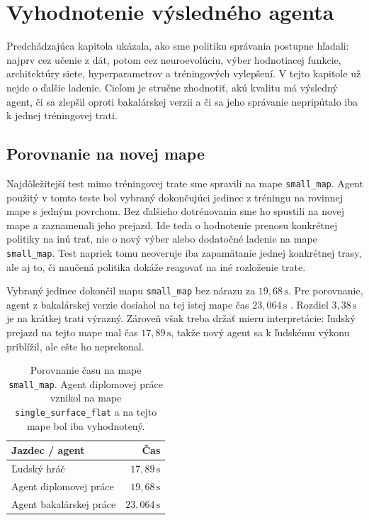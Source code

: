 \chapter{Vyhodnotenie výsledného agenta}
\label{chap:vyhodnotenie_agenta}

Predchádzajúca kapitola ukázala, ako sme politiku správania postupne hľadali: najprv cez učenie z dát, potom cez neuroevolúciu, výber hodnotiacej funkcie, architektúry siete, hyperparametrov a tréningových vylepšení. V tejto kapitole už nejde o ďalšie ladenie. Cieľom je stručne zhodnotiť, akú kvalitu má výsledný agent, či sa zlepšil oproti bakalárskej verzii a či sa jeho správanie nepripútalo iba k jednej tréningovej trati.

\section{Porovnanie na novej mape}

Najdôležitejší test mimo tréningovej trate sme spravili na mape \texttt{small\_map}. Agent použitý v tomto teste bol vybraný dokončujúci jedinec z tréningu na rovinnej mape s jedným povrchom. Bez ďalšieho dotrénovania sme ho spustili na novej mape a zaznamenali jeho prejazd. Ide teda o hodnotenie prenosu konkrétnej politiky na inú trať, nie o nový výber alebo dodatočné ladenie na mape \texttt{small\_map}. Test napriek tomu neoveruje iba zapamätanie jednej konkrétnej trasy, ale aj to, či naučená politika dokáže reagovať na iné rozloženie trate.

Vybraný jedinec dokončil mapu \texttt{small\_map} bez nárazu za \(19{,}68\,\mathrm{s}\). Pre porovnanie, agent z bakalárskej verzie dosiahol na tej istej mape čas \(23{,}064\,\mathrm{s}\) \cite{melkovic2024bachelor}. Rozdiel \(3{,}38\,\mathrm{s}\) je na krátkej trati výrazný. Zároveň však treba držať mieru interpretácie: ľudský prejazd na tejto mape mal čas \(17{,}89\,\mathrm{s}\), takže nový agent sa k ľudskému výkonu priblížil, ale ešte ho neprekonal.

\begin{table}[htbp]
    \centering
    \renewcommand{\arraystretch}{1.12}
    \caption[Porovnanie času na mape \texttt{small\_map}]{Porovnanie času na mape \texttt{small\_map}. Agent diplomovej práce vznikol na mape \texttt{single\_surface\_flat} a na tejto mape bol iba vyhodnotený.}
    \label{tab:evaluation_small_map_times}
    \begin{tabular}{lr}
        \toprule
        Jazdec / agent & Čas \\
        \midrule
        Ľudský hráč & \(17{,}89\,\mathrm{s}\) \\
        Agent diplomovej práce & \(19{,}68\,\mathrm{s}\) \\
        Agent bakalárskej práce & \(23{,}064\,\mathrm{s}\) \\
        \bottomrule
    \end{tabular}
\end{table}

